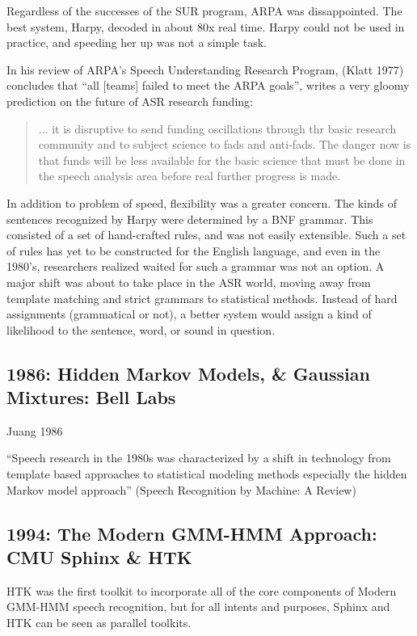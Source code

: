 \documentclass[10pt,a4paper]{article}
\begin{document}
Regardless of the successes of the SUR program, ARPA was dissappointed. The best system, Harpy, decoded in about 80x real time. Harpy could not be used in practice, and speeding her up was not a simple task.

In his review of ARPA's Speech Understanding Research Program, (Klatt 1977) concludes that ``all [teams] failed to meet the ARPA goals'', writes a very gloomy prediction on the future of ASR research funding:

\begin{quote}
  ... it is disruptive to send funding oscillations through thr basic research community and to subject science to fads and anti-fads. The danger now is that funds will be less available for the basic science that must be done in the speech analysis area before real further progress is made.
\end{quote}

In addition to problem of speed, flexibility was a greater concern. The kinds of sentences recognized by Harpy were determined by a BNF grammar. This consisted of a set of hand-crafted rules, and was not easily extensible. Such a set of rules has yet to be constructed for the English language, and even in the 1980's, researchers realized waited for such a grammar was not an option. A major shift was about to take place in the ASR world, moving away from template matching and strict grammars to statistical methods. Instead of hard assignments (grammatical or not), a better system would assign a kind of likelihood to the sentence, word, or sound in question.

\subsection{1986: Hidden Markov Models, \& Gaussian Mixtures: Bell Labs}

Juang 1986

``Speech research in the 1980s was characterized by a shift in technology from template based approaches to statistical modeling methods especially the hidden Markov model approach'' (Speech Recognition by Machine: A Review)


\subsection{1994: The Modern GMM-HMM Approach: CMU Sphinx \& HTK}

HTK was the first toolkit to incorporate all of the core components of Modern GMM-HMM speech recognition, but for all intents and purposes, Sphinx and HTK can be seen as parallel toolkits.
\end{document}
